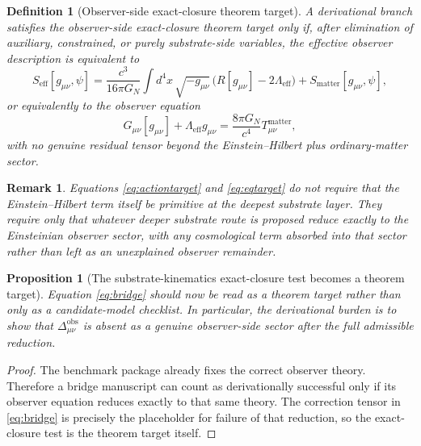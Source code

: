 \documentclass[11pt]{article}
\newcommand{\ObserverCorr}{\Delta_{\mu\nu}^{\mathrm{obs}}}
\newcommand{\ObserverMetric}{g_{\mu\nu}}
\newtheorem{definition}{Definition}
\newtheorem{proposition}{Proposition}
\newtheorem{remark}{Remark}
\begin{document}
\begin{definition}[Observer-side exact-closure theorem target]
A derivational branch satisfies the \emph{observer-side exact-closure theorem target} only if, after elimination of auxiliary, constrained, or purely substrate-side variables, the effective observer description is equivalent to
\begin{equation}
S_{\mathrm{eff}}[\ObserverMetric,\psi]
=
\frac{c^3}{16\pi G_N}
\int d^4x\,\sqrt{-\ObserverMetric}\,
\bigl(R[\ObserverMetric]-2\Lambda_{\mathrm{eff}}\bigr)
+ S_{\mathrm{matter}}[\ObserverMetric,\psi],
\label{eq:actiontarget}
\end{equation}
or equivalently to the observer equation
\begin{equation}
G_{\mu\nu}[\ObserverMetric]
+ \Lambda_{\mathrm{eff}}\ObserverMetric
=
\frac{8\pi G_N}{c^4}T_{\mu\nu}^{\mathrm{matter}},
\label{eq:eqtarget}
\end{equation}
with no genuine residual tensor beyond the Einstein--Hilbert plus ordinary-matter sector.
\end{definition}

\begin{remark}
Equations \eqref{eq:actiontarget} and \eqref{eq:eqtarget} do \emph{not} require that the Einstein--Hilbert term itself be primitive at the deepest substrate layer. They require only that whatever deeper substrate route is proposed reduce exactly to the Einsteinian observer sector, with any cosmological term absorbed into that sector rather than left as an unexplained observer remainder.
\end{remark}

\begin{proposition}[The substrate-kinematics exact-closure test becomes a theorem target]
Equation \eqref{eq:bridge} should now be read as a theorem target rather than only as a candidate-model checklist. In particular, the derivational burden is to show that \(\ObserverCorr\) is absent as a genuine observer-side sector after the full admissible reduction.
\end{proposition}

\begin{proof}
The benchmark package already fixes the correct observer theory. Therefore a bridge manuscript can count as derivationally successful only if its observer equation reduces exactly to that same theory. The correction tensor in \eqref{eq:bridge} is precisely the placeholder for failure of that reduction, so the exact-closure test is the theorem target itself.
\end{proof}
\end{document}
